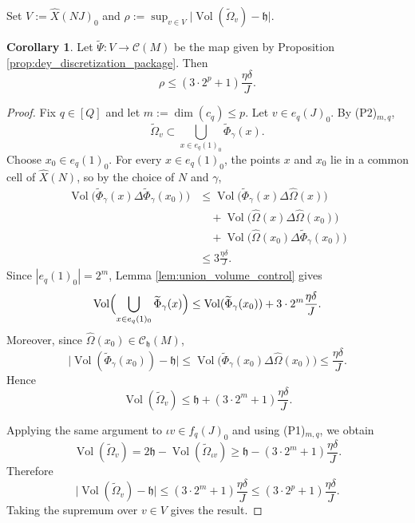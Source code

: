 \documentclass[12pt,english]{article}
\theoremstyle{definition}
\newtheorem{corollary}[theorem]{Corollary}
\begin{document}
Set $V:=\widehat X(NJ)_0$ and $\rho:=\sup_{v\in V}\bigl|\operatorname{Vol}(\widetilde\Omega_v)-\mathfrak h\bigr|$.

\begin{corollary}
\label{cor:dey_small_defect}
Let $\widetilde\Psi:V\to \mathcal C(M)$ be the map given by Proposition
\ref{prop:dey_discretization_package}.
Then
\[
\rho \le \left(3\cdot 2^p+1\right)\frac{\eta\delta}{J}.
\]
\end{corollary}

\begin{proof}
Fix $q\in[Q]$ and let $m:=\dim(c_q)\le p$.
Let $v\in e_q(J)_0$. By \rm(P2)$_{m,q}$,
\[
\widetilde\Omega_v\subset \bigcup_{x\in e_q(1)_0}\widetilde\Phi_\gamma(x).
\]
Choose $x_0\in e_q(1)_0$. For every $x\in e_q(1)_0$, the points $x$ and $x_0$ lie in a common cell
of $\widehat X(N)$, so by the choice of $N$ and $\gamma$,
\[
\begin{aligned}
\operatorname{Vol}\bigl(\widetilde\Phi_\gamma(x)\Delta \widetilde\Phi_\gamma(x_0)\bigr)
&\le
\operatorname{Vol}\bigl(\widetilde\Phi_\gamma(x)\Delta\widehat\Omega(x)\bigr) \\
&\quad
+\operatorname{Vol}\bigl(\widehat\Omega(x)\Delta\widehat\Omega(x_0)\bigr) \\
&\quad
+\operatorname{Vol}\bigl(\widehat\Omega(x_0)\Delta\widetilde\Phi_\gamma(x_0)\bigr) \\
&\le 3\frac{\eta\delta}{J}.
\end{aligned}
\]
Since $|e_q(1)_0|=2^m$, Lemma \ref{lem:union_volume_control} gives
\[
\operatorname{Vol}\Bigl(\bigcup_{x\in e_q(1)_0}\widetilde\Phi_\gamma(x)\Bigr)
\le \operatorname{Vol}(\widetilde\Phi_\gamma(x_0))+3\cdot 2^m\frac{\eta\delta}{J}.
\]
Moreover, since $\widehat\Omega(x_0)\in\mathcal{C}_{\mathfrak h}(M)$,
\[
\bigl|\operatorname{Vol}(\widetilde\Phi_\gamma(x_0))-\mathfrak h\bigr|
\le \operatorname{Vol}\bigl(\widetilde\Phi_\gamma(x_0)\Delta\widehat\Omega(x_0)\bigr)
\le \frac{\eta\delta}{J}.
\]
Hence
\[
\operatorname{Vol}(\widetilde\Omega_v)\le \mathfrak h+\left(3\cdot 2^m+1\right)\frac{\eta\delta}{J}.
\]

Applying the same argument to $\iota v\in f_q(J)_0$ and using \rm(P1)$_{m,q}$, we obtain
\[
\operatorname{Vol}(\widetilde\Omega_v)
=
2\mathfrak h-\operatorname{Vol}(\widetilde\Omega_{\iota v})
\ge
\mathfrak h-\left(3\cdot 2^m+1\right)\frac{\eta\delta}{J}.
\]
Therefore
\[
\bigl|\operatorname{Vol}(\widetilde\Omega_v)-\mathfrak h\bigr|
\le
\left(3\cdot 2^m+1\right)\frac{\eta\delta}{J}
\le
\left(3\cdot 2^p+1\right)\frac{\eta\delta}{J}.
\]
Taking the supremum over $v\in V$ gives the result.
\end{proof}
\end{document}
